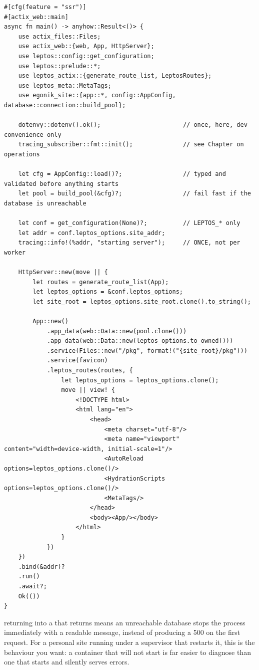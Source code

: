 \begin{lstlisting}[style=rs,caption={The target \file{src/main.rs}.}]
#[cfg(feature = "ssr")]
#[actix_web::main]
async fn main() -> anyhow::Result<()> {
    use actix_files::Files;
    use actix_web::{web, App, HttpServer};
    use leptos::config::get_configuration;
    use leptos::prelude::*;
    use leptos_actix::{generate_route_list, LeptosRoutes};
    use leptos_meta::MetaTags;
    use egonik_site::{app::*, config::AppConfig, database::connection::build_pool};

    dotenvy::dotenv().ok();                       // once, here, dev convenience only
    tracing_subscriber::fmt::init();              // see Chapter on operations

    let cfg = AppConfig::load()?;                 // typed and validated before anything starts
    let pool = build_pool(&cfg)?;                 // fail fast if the database is unreachable

    let conf = get_configuration(None)?;          // LEPTOS_* only
    let addr = conf.leptos_options.site_addr;
    tracing::info!(%addr, "starting server");     // ONCE, not per worker

    HttpServer::new(move || {
        let routes = generate_route_list(App);
        let leptos_options = &conf.leptos_options;
        let site_root = leptos_options.site_root.clone().to_string();

        App::new()
            .app_data(web::Data::new(pool.clone()))
            .app_data(web::Data::new(leptos_options.to_owned()))
            .service(Files::new("/pkg", format!("{site_root}/pkg")))
            .service(favicon)
            .leptos_routes(routes, {
                let leptos_options = leptos_options.clone();
                move || view! {
                    <!DOCTYPE html>
                    <html lang="en">
                        <head>
                            <meta charset="utf-8"/>
                            <meta name="viewport" content="width=device-width, initial-scale=1"/>
                            <AutoReload options=leptos_options.clone()/>
                            <HydrationScripts options=leptos_options.clone()/>
                            <MetaTags/>
                        </head>
                        <body><App/></body>
                    </html>
                }
            })
    })
    .bind(&addr)?
    .run()
    .await?;
    Ok(())
}
\end{lstlisting}

\begin{pattern}
 returning  into a  that returns
 means an unreachable database stops the process immediately with a
readable message, instead of producing a 500 on the first request. For a personal site running
under a supervisor that restarts it, this is the behaviour you want: a container that will not
start is far easier to diagnose than one that starts and silently serves errors.
\end{pattern}
